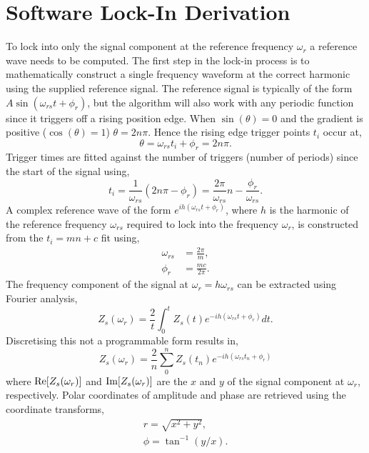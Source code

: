 \documentclass{article}
\begin{document}
\section{Software Lock-In Derivation}

To lock into only the signal component at the reference frequency $\omega_r$ a reference wave needs to be computed. The first step in the lock-in process is to mathematically construct a single frequency waveform at the correct harmonic using the supplied reference signal. The reference signal is typically of the form $A\sin(\omega_{rs} t + \phi_r)$, but the algorithm will also work with any periodic function since it triggers off a rising position edge.
When $\sin(\theta)=0$ and the gradient is positive ($\cos(\theta)=1$) $\theta=2n\pi$. Hence the rising edge trigger points $t_i$ occur at,
\begin{equation} \theta = \omega_{rs} t_i + \phi_r = 2n\pi. \end{equation}
Trigger times are fitted against the number of triggers (number of periods) since the start of the signal using,
\begin{equation}
t_i = \frac{1}{\omega_{rs}}(2n\pi - \phi_r) = \frac{2\pi}{\omega_{rs}}n - \frac{\phi_r}{\omega_{rs}}.
\end{equation}
A complex reference wave of the form $e^{ih(\omega_{rs} t + \phi_r)}$, where $h$ is the harmonic of the reference frequency $\omega_{rs}$ required to lock into the frequency $\omega_r$, is constructed from the $t_i=mn+c$ fit using,
\begin{align}
\omega_{rs} &= \frac{2\pi}{m}, \\
\phi_r &= \frac{mc}{2\pi}.
\end{align}
The frequency component of the signal at $\omega_r=h\omega_{rs}$ can be extracted using Fourier analysis,
\begin{equation}
Z_s(\omega_r) = \frac{2}{t} \int_0^t{Z_s(t) e^{-ih(\omega_{rs} t + \phi_r)} dt}.
\end{equation}
Discretising this not a programmable form results in,
\begin{equation}
Z_s(\omega_r) = \frac{2}{n} \sum_0^n{Z_s(t_n) e^{-ih(\omega_{rs} t_n + \phi_r)}}
\end{equation}
where $\mathrm{Re}\!\left[{Z_s(\omega_r)}\right]$ and $\mathrm{Im}\!\left[{Z_s(\omega_r)}\right]$ are the $x$ and $y$ of the signal component at $\omega_r$, respectively. Polar coordinates of amplitude and phase are retrieved using the coordinate transforms,
\begin{align}
r = \sqrt{x^2 + y^2}, \\
\phi = \tan^{-1}(y/x).
\end{align}
\end{document}
